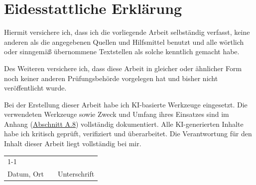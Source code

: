 \chapter*{Eidesstattliche Erklärung}

Hiermit versichere ich, dass ich die vorliegende Arbeit selbständig verfasst, keine anderen
als die angegebenen Quellen und Hilfsmittel benutzt und alle wörtlich oder sinngemäß
übernommene Textstellen als solche kenntlich gemacht habe.

Des Weiteren versichere ich, dass diese Arbeit in gleicher oder ähnlicher Form noch keiner anderen Prüfungsbehörde vorgelegen hat und bisher nicht veröffentlicht wurde.

Bei der Erstellung dieser Arbeit habe ich KI-basierte Werkzeuge eingesetzt. Die verwendeten Werkzeuge sowie Zweck und Umfang ihres Einsatzes sind im Anhang (\hyperref[app:kiwerkzeuge]{Abschnitt A.8}) vollständig dokumentiert. Alle KI-generierten Inhalte habe ich kritisch geprüft, verifiziert und überarbeitet. Die Verantwortung für den Inhalt dieser Arbeit liegt vollständig bei mir.

\vspace{3cm}

\begin{tabular}{p{}cp{}}
	\cline{1-1} \cline{3-3} \\
	\raggedright Datum, Ort & & \raggedright Unterschrift
\end{tabular}
